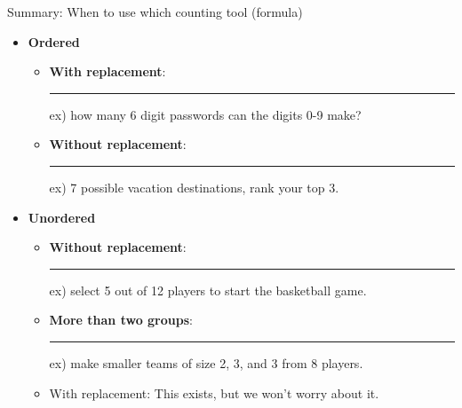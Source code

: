 \documentclass{article}
\newcommand{\blankul}[1]{\rule[-1.5mm]{#1}{0.15mm}}	%
\begin{document}
Summary: When to use which counting tool (formula)\bigskip
\begin{itemize}
    \item \textbf{Ordered}
    \begin{itemize}
        \item \textbf{With replacement}: \blankul{2cm} \quad ex) how many 6 digit passwords can the digits 0-9 make?
        \item \textbf{Without replacement}: \blankul{2cm} \quad ex) 7 possible vacation destinations, rank your top 3.
    \end{itemize}
    \item \textbf{Unordered}
        \begin{itemize}
        \item \textbf{Without replacement}: \blankul{2cm} \quad ex) select 5 out of 12 players to start the basketball game.
        \item[] \textbf{More than two groups}: \blankul{2cm} \quad ex) make smaller teams of size 2, 3, and 3 from 8 players.
        \item With replacement: This exists, but we won't worry about it.
    \end{itemize}
\end{itemize}



    

    
\end{document}
